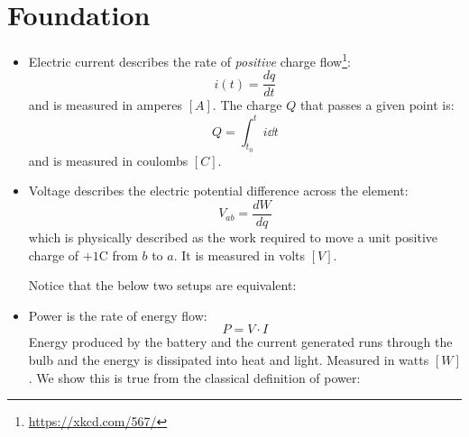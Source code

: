 \section{Foundation}
\begin{itemize}
    \item Electric current describes the rate of \textit{positive} charge flow\footnote{\url{https://xkcd.com/567/}}:
    \begin{equation}
        i(t) = \frac{dq}{dt}
    \end{equation}
    and is measured in amperes $[A]$. The charge $Q$ that passes a given point is:
    \begin{equation}
        Q = \int_{t_0}^{t} i \dd{t}
    \end{equation}
    and is measured in coulombs $[C]$.
    \item Voltage describes the electric potential difference across the element:
    \begin{equation}
        V_{ab} = \frac{dW}{dq}
    \end{equation}
    which is physically described as the work required to move a unit positive charge of $+1\si{\coulomb}$ from $b$ to $a$. It is measured in volts $[V]$.
    \begin{center}
    \end{center}
    Notice that the below two setups are equivalent:
    \begin{center}
        \hspace{10mm}
    \end{center}
    \item Power is the rate of energy flow:
    \begin{equation}
        P = V \cdot I
    \end{equation}
    Energy produced by the battery and the current generated runs through the bulb and the energy is dissipated into heat and light. Measured in watts $[W]$. We show this is true from the classical definition of power:

\end{itemize}
